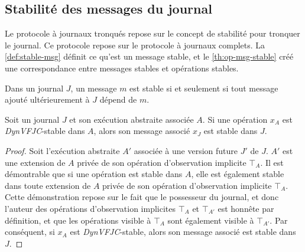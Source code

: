 

\subsection{Stabilité des messages du journal}\label{subsec:msg-stable}

Le protocole à journaux tronqués repose sur le concept de stabilité pour tronquer le journal.
Ce protocole repose sur le protocole à journaux complets.
La \autoref{def:stable-msg} définit ce qu'est un message stable, et le \autoref{th:op-msg-stable} créé une correspondance entre messages stables et opérations stables.

\begin{definition}\label{def:stable-msg}
Dans un journal $J$, un message $m$ est stable si et seulement si tout message ajouté ultérieurement à $J$ dépend de $m$.
\end{definition}

\begin{theorem}\label{th:op-msg-stable}
Soit un journal $J$ et son exécution abstraite associée $A$.
Si une opération $x_A$ est \emph{DynVFJC}-stable dans $A$, alors son message associé $x_J$ est stable dans $J$.
\end{theorem}

\begin{proof}
Soit l'exécution abstraite $A'$ associée à une version future $J'$ de $J$.
$A'$ est une extension de $A$ privée de son opération d'observation implicite $\top_A$.
Il est démontrable que si une opération est stable dans $A$, elle est également stable dans toute extension de $A$ privée de son opération d'observation implicite $\top_A$.
Cette démonstration repose sur le fait que le possesseur du journal, et donc l'auteur des opérations d'observation implicites $\top_A$ et $\top_{A'}$ est honnête par définition, et que les opérations visible à $\top_A$ sont également visible à $\top_{A'}$.
Par conséquent, si $x_A$ est \emph{DynVFJC}-stable, alors son message associé est stable dans $J$.
\end{proof}


